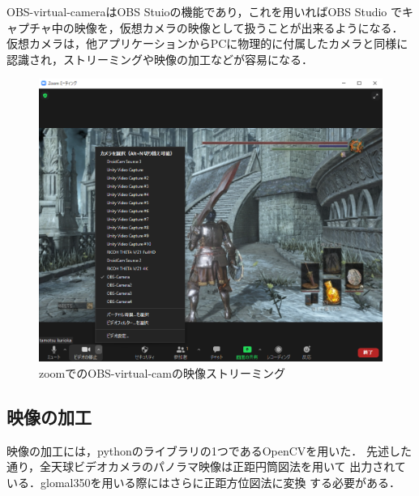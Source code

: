 OBS-virtual-cameraはOBS Stuioの機能であり，これを用いればOBS Studio
でキャプチャ中の映像を，仮想カメラの映像として扱うことが出来るようになる．
仮想カメラは，他アプリケーションからPCに物理的に付属したカメラと同様に
認識され，ストリーミングや映像の加工などが容易になる．

\begin{figure}[tbp]
  \centering
  \includegraphics[scale=0.5]{fig/streaming.png}
  \caption{zoomでのOBS-virtual-camの映像ストリーミング}
\end{figure}

\subsection*{映像の加工}
映像の加工には，pythonのライブラリの1つであるOpenCVを用いた．
先述した通り，全天球ビデオカメラのパノラマ映像は正距円筒図法を用いて
出力されている．glomal350を用いる際にはさらに正距方位図法に変換
する必要がある．

